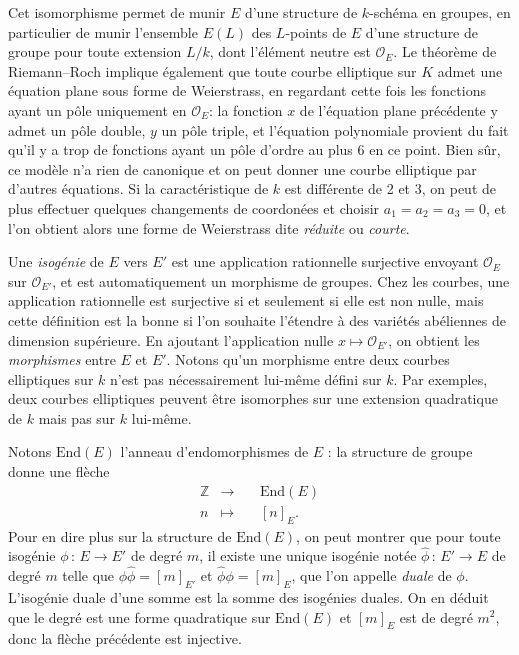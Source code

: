 \documentclass[11pt,a4paper]{article}
\newcommand{\Z}{\mathbb{Z}}
\renewcommand{\O}{\mathcal{O}}
\newcommand{\vers}{\longrightarrow}
\newcommand{\End}{\mathrm{End}}
\newcommand{\de}{\,:\,}
\renewcommand{\v}{\vspace{5mm}}
\theoremstyle{definition}
\begin{document}
Cet isomorphisme permet de munir $E$ d'une structure de $k$-schéma en groupes, en particulier de munir l'ensemble $E(L)$ des $L$-points de $E$ d'une structure de groupe pour toute extension $L/k$, dont l'élément neutre est $\O_E$. Le théorème de Riemann--Roch implique également que toute courbe elliptique sur $K$ admet une équation plane sous forme de Weierstrass, en regardant cette fois les fonctions ayant un pôle uniquement en $\O_E$: la fonction $x$ de l'équation plane précédente y admet un pôle double, $y$ un pôle triple, et l'équation polynomiale provient du fait qu'il y a trop de fonctions ayant un pôle d'ordre au plus 6 en ce point. Bien sûr, ce modèle n'a rien de canonique et on peut donner une courbe elliptique par d'autres équations. Si la caractéristique de $k$ est différente de 2 et 3, on peut de plus effectuer quelques changements de coordonées et choisir $a_1 = a_2 = a_3 = 0$, et l'on obtient alors une forme de Weierstrass dite \emph{réduite} ou \emph{courte}.

\v

Une \emph{isogénie} de $E$ vers $E'$ est une application rationnelle surjective envoyant $\O_E$ sur $\O_{E'}$, et est automatiquement un morphisme de groupes. Chez les courbes, une application rationnelle est surjective si et seulement si elle est non nulle, mais cette définition est la bonne si l'on souhaite l'étendre à des variétés abéliennes de dimension supérieure. En ajoutant l'application nulle $x\mapsto \O_{E'}$, on obtient les \emph{morphismes} entre $E$ et $E'$. Notons qu'un morphisme entre deux courbes elliptiques sur $k$ n'est pas nécessairement lui-même défini sur $k$. Par exemples, deux courbes elliptiques peuvent être isomorphes sur une extension quadratique de $k$ mais pas sur $k$ lui-même.

Notons $\End(E)$ l'anneau d'endomorphismes de $E$ : la structure de groupe donne une flèche
$$\begin{aligned}
&\Z &\longrightarrow&\ &\End(E) &\\
&n &\longmapsto& &[n]_E .\ \ &
\end{aligned}$$
Pour en dire plus sur la structure de $\End(E)$, on peut montrer que pour toute isogénie $\phi\de E\vers E'$ de degré $m$, il existe une unique isogénie notée $\widehat{\phi}\de E'\vers E$ de degré $m$ telle que $\phi\widehat{\phi}=[m]_{E'}$ et $\widehat{\phi}\phi=[m]_{E}$, que l'on appelle \emph{duale} de $\phi$. L'isogénie duale d'une somme est la somme des isogénies duales. On en déduit que le degré est une forme quadratique sur $\End(E)$ et $[m]_E$ est de degré $m^2$, donc la flèche précédente est injective.
\end{document}
